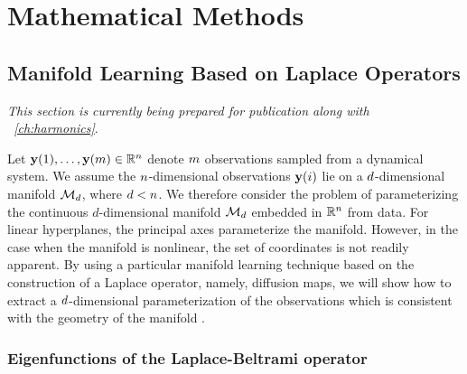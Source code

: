 
\graphicspath{{ch-math/figures/}}

\chapter{Mathematical Methods}\label{ch:math}


\section{Manifold Learning Based on Laplace Operators} \label{sec:manifold_learning}

{\em This section is currently being prepared for publication along with \chap~\ref{ch:harmonics}}.
%
%

Let $\mathbf{y}(1), \dots, \mathbf{y}(m) \in \mathbb{R}^n$ denote $m$ observations sampled from a dynamical system.
%
We assume the $n$-dimensional observations $\mathbf{y}(i)$ lie on a $d$-dimensional manifold $\mathcal{M}_d$, where $d < n$.
%
We therefore consider the problem of parameterizing the continuous $d$-dimensional manifold $\mathcal{M}_d$ embedded in $\mathbb{R}^n$ from data.
%
For linear hyperplanes, the principal axes parameterize the manifold.
%
However, in the case when the manifold is nonlinear, the set of coordinates is not readily apparent.
%
By using a particular manifold learning technique based on the construction of a Laplace operator, namely, diffusion maps, we will show how to extract a $d$-dimensional parameterization of the observations which is consistent with the geometry of the manifold \cite{Belkin2003, coifman2005geometric, singer2008non}.

\subsection{Eigenfunctions of the Laplace-Beltrami operator}

